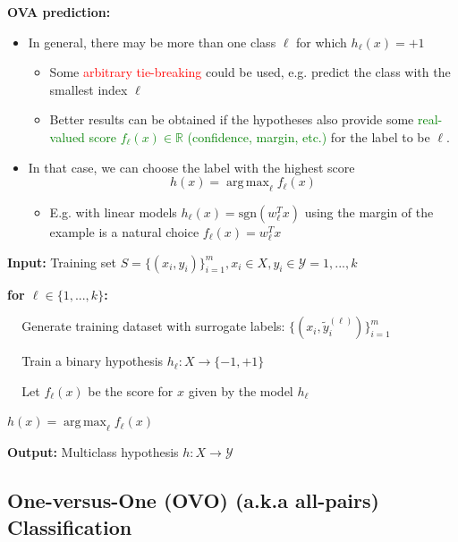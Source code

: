 \documentclass[12pt, a4paper]{article}
\DeclareMathOperator*{\argmax}{arg\,max} %
\begin{document}
\textbf{OVA prediction:}

\begin{itemize}
  \item In general, there may be more than one class $\ell$ for which $h_{\ell}(x) = +1$
  \begin{itemize}
    \item Some \textcolor{red}{arbitrary tie-breaking} could be used, e.g. predict the class with the smallest index $\ell$
    \item Better results can be obtained if the hypotheses also provide some \textcolor{Green}{real-valued score $f_{\ell}(x) \in \mathbb{R}$ (confidence, margin, etc.)} for the label to be $\ell$.
  \end{itemize}
  \item In that case, we can choose the label with the highest score
  $$
  h(x) = \argmax_{\ell} f_{\ell}(x)
  $$
  \begin{itemize}
    \item E.g. with linear models $h_{\ell}(x) = \text{sgn}(w_{\ell}^T x)$ using the margin of the example is a natural choice $f_{\ell}(x) = w_{\ell}^T x$
  \end{itemize}
\end{itemize}



\begin{tcolorbox}[title={OVA training pseudo-code}]

  \textbf{Input:} Training set $S = \{(x_i,y_i)\}_{i=1}^m, x_i \in X, y_i \in \mathcal{Y} = {1, ..., k}$

  \textbf{for $\ell \in \{1, ..., k\}$:}
  \begin{description}
    \item $\;\;\;$ Generate training dataset with surrogate labels: $\{(x_i, \tilde{y}_i^{(\ell)})\}_{i=1}^m$
    \item $\;\;\;$ Train a binary hypothesis $h_{\ell} : X \to \{-1,+1\}$
    \item $\;\;\;$ Let $f_{\ell}(x)$ be the score for $x$ given by the model $h_{\ell}$
  \end{description}
  $h(x) = \argmax_{\ell} f_{\ell}(x)$

  \textbf{Output:} Multiclass hypothesis $h: X \to \mathcal{Y}$
\end{tcolorbox}






\subsection{One-versus-One (OVO) (a.k.a all-pairs) Classification}\label{ovo-classification}
\end{document}
